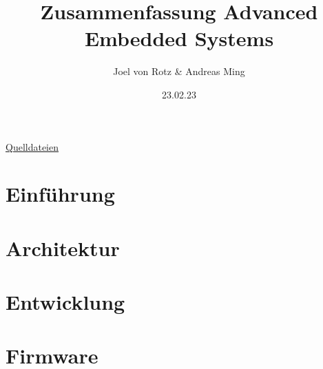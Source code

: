 \documentclass[
  10pt,
  a4paper,
]{article}
\title{Zusammenfassung Advanced Embedded Systems}
\author{Joel von Rotz \& Andreas Ming}
\date{23.02.23}
\numberwithin{equation}{section}
\renewcommand*\contentsname{Inhaltsverzeichnis}
\newcommand\contentsname{Inhaltsverzeichnis}
\begin{document}

\makeatletter
\begin{center}
  \vspace*{0.5cm}
  
  \textbf{\Huge \@title}
  
  \vspace{0.1cm}

  {\Large {\@author \hspace{4.8cm} \@date}}
  
  \vspace{0.5cm}

\end{center}
\makeatother

\begin{center}
{\large \faGithub\space \href{https://www.youtube.com/watch?v=dQw4w9WgXcQ}{Quelldateien}}
\end{center}




\ifdefined\Shaded\renewenvironment{Shaded}{\begin{tcolorbox}[colback={shadecolor}, boxrule=0pt, frame hidden, enhanced, breakable]}{\end{tcolorbox}}\fi\ifdefined\Shaded\renewenvironment{Shaded}{\begin{tcolorbox}[frame hidden, enhanced, breakable, colback={shadecolor}, boxrule=0pt]}{\end{tcolorbox}}\fi

\renewcommand*\contentsname{Inhaltsverzeichnis}
{
\hypersetup{linkcolor=}
\setcounter{tocdepth}{3}
\tableofcontents
}
\hypertarget{einfuxfchrung}{%
\section{Einführung}\label{einfuxfchrung}}

\hypertarget{architektur}{%
\section{Architektur}\label{architektur}}

\hypertarget{entwicklung}{%
\section{Entwicklung}\label{entwicklung}}

\hypertarget{firmware}{%
\section{Firmware}\label{firmware}}
\end{document}
